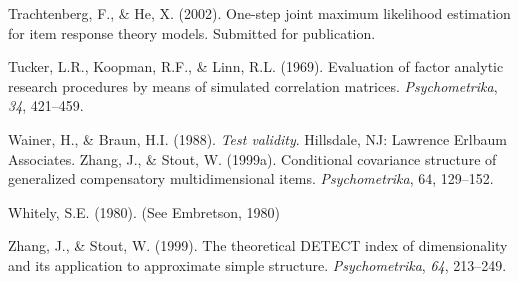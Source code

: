 \documentclass[titlepage,11pt,twoside]{article}
\begin{document}
\begin{thebibliography}
\bibitem Trachtenberg, F., \& He, X. (2002). One-step joint maximum likelihood estimation for item response theory models. Submitted for publication.

\bibitem Tucker, L.R., Koopman, R.F., \& Linn, R.L. (1969). Evaluation of factor analytic research procedures by means of simulated correlation matrices. \textit{Psychometrika}, \textit{34}, 421--459.

\bibitem Wainer, H., \& Braun, H.I. (1988). \textit{Test validity}. Hillsdale, NJ: Lawrence Erlbaum Associates. Zhang, J., \& Stout, W. (1999a). Conditional covariance structure of generalized compensatory multidimensional items. \textit{Psychometrika}, 64, 129--152.

\bibitem Whitely, S.E. (1980). (See Embretson, 1980)

\bibitem Zhang, J., \& Stout, W. (1999). The theoretical DETECT index of dimensionality and its application to approximate simple structure. \textit{Psychometrika}, \textit{64}, 213--249.
\end{thebibliography}
\vspace{\fill}

\end{document}
